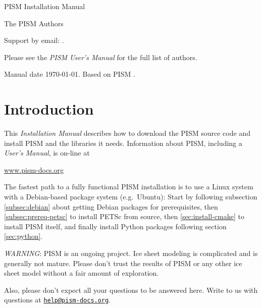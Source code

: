 \documentclass[titlepage,letterpaper,final]{scrartcl}
\begin{document}
\begin{titlepage}

  \begin{center}
    \vspace*{3.5cm}
    {\huge{} PISM Installation Manual}
    \vspace{0.5cm}

    {\Large The PISM Authors}
    \vspace{1cm}
  \end{center}

\setcounter{tocdepth}{3}
\small
\tableofcontents
\normalsize

\vspace{0.3in}

  \begin{center}
    \small Support by email: \PISMEMAIL.

    \medskip
    Please see the \emph{PISM User's Manual} for the full list of authors.

    \medskip
    Manual date \today.  Based on PISM \PISMREV.

    \medskip
    \PISMDOWNLOADMSG
 \end{center}

\end{titlepage}

\section*{Introduction}

\large
This \emph{Installation Manual} describes how to download the PISM source code and install PISM and the libraries it needs.  Information about PISM, including a \emph{User's Manual}, is on-line at
\bigskip
\begin{center}
  \href{http://www.pism-docs.org}{www.pism-docs.org}
\end{center}
\bigskip
\noindent The fastest path to a fully functional PISM installation is to use a Linux system with a Debian-based package system (e.g.~Ubuntu):  Start by following subsection \ref{subsec:debian} about getting Debian packages for prerequisites, then \ref{subsec:prereq-petsc} to install PETSc from source, then \ref{sec:install-cmake} to install PISM itself, and finally install Python packages following section \ref{sec:python}.

\vfill

\large
\begin{center}
\parbox{5.5in}{ \emph{WARNING}:  PISM is an ongoing project.  Ice sheet modeling is complicated and is generally not mature.  Please don't trust the results of PISM or any other ice sheet model without a fair amount of exploration.

\bigskip
Also, please don't expect all your questions to be answered here.  Write to us with questions at \href{mailto:help@pism-docs.org}{\texttt{help@pism-docs.org}}.}
\normalsize
\end{center}
\normalsize
\vfill
\end{document}
